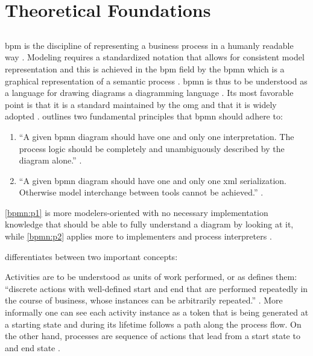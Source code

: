 \chapter{Theoretical Foundations}
\label{ch:foundations}

\section{}
\label{sec:bpmn}

\gls{bpm} is the discipline of representing a business process in a humanly readable way \citep{Silver2011}. Modeling requires a standardized notation that allows for consistent model representation and this is achieved in the \gls{bpm} field by the \gls{bpmn} which is a graphical representation of a semantic process \citep{Silver2011}. \gls{bpmn} is thus to be understood as a language for drawing diagrams \ie a diagramming language \citep{Silver2011}. Its most favorable point is that it is a standard maintained by the \gls{omg} and that it is widely adopted \citep{Silver2011}. \citet{Silver2011} outlines two fundamental principles that \gls{bpmn} should adhere to:

\begin{enumerate}[label=\textbf{P. \Roman*},ref=Principle \Roman*]
 	\item ``A given \gls{bpmn} diagram should have one and only one interpretation. The process logic should be completely and unambiguously described by the diagram alone.'' \citep[p. v]{Silver2011}. \label{bpmn:p1}
 	\item ``A given \gls{bpmn} diagram should have one and only one \gls{xml} serialization. Otherwise model interchange between tools cannot be achieved.'' \citep[p. v]{Silver2011}. \label{bpmn:p2}
\end{enumerate} 

\ref{bpmn:p1} is more modelers-oriented with no necessary implementation knowledge that should be able to fully understand a diagram by looking at it, while \ref{bpmn:p2} applies more to implementers and process interpreters \citep{Silver2011}. 

\citet{Silver2011} differentiates between two important concepts:

\begin{enumerate}
	 Activities are to be understood as units of work performed, or as \citet{Silver2011} defines them: ``discrete actions with well-defined start and end that are performed repeatedly in the course of business, whose instances can be arbitrarily repeated.'' \citep[p. 10]{Silver2011}.
	 More informally one can see each activity instance as a token that is being generated at a starting state and during its lifetime follows a path along the process flow. On the other hand, processes are sequence of actions that lead from a start state to and end state \citep[p. 11]{Silver2011}.
\end{enumerate}

